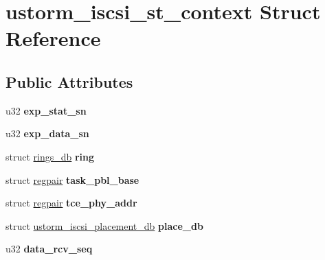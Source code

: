 \hypertarget{structustorm__iscsi__st__context}{
\section{ustorm\_\-iscsi\_\-st\_\-context Struct Reference}
\label{structustorm__iscsi__st__context}
}
\subsection*{Public Attributes}
\begin{DoxyCompactItemize}
\item 
\hypertarget{structustorm__iscsi__st__context_a0984ed8aecf44c26563da4ea19f72ad2}{
u32 {\bfseries exp\_\-stat\_\-sn}}
\label{structustorm__iscsi__st__context_a0984ed8aecf44c26563da4ea19f72ad2}

\item 
\hypertarget{structustorm__iscsi__st__context_ad22d74f156f85f8bc7b51f7c9fc9d5d4}{
u32 {\bfseries exp\_\-data\_\-sn}}
\label{structustorm__iscsi__st__context_ad22d74f156f85f8bc7b51f7c9fc9d5d4}

\item 
\hypertarget{structustorm__iscsi__st__context_af02afa453727feaea584090b829a2a4d}{
struct \hyperlink{structrings__db}{rings\_\-db} {\bfseries ring}}
\label{structustorm__iscsi__st__context_af02afa453727feaea584090b829a2a4d}

\item 
\hypertarget{structustorm__iscsi__st__context_abf27d498849c647ade18601549729c87}{
struct \hyperlink{structregpair}{regpair} {\bfseries task\_\-pbl\_\-base}}
\label{structustorm__iscsi__st__context_abf27d498849c647ade18601549729c87}

\item 
\hypertarget{structustorm__iscsi__st__context_a631c57f473c3214ceb3f52697fe7bd18}{
struct \hyperlink{structregpair}{regpair} {\bfseries tce\_\-phy\_\-addr}}
\label{structustorm__iscsi__st__context_a631c57f473c3214ceb3f52697fe7bd18}

\item 
\hypertarget{structustorm__iscsi__st__context_a84fc6397a2530b6673c9ed66119de30f}{
struct \hyperlink{structustorm__iscsi__placement__db}{ustorm\_\-iscsi\_\-placement\_\-db} {\bfseries place\_\-db}}
\label{structustorm__iscsi__st__context_a84fc6397a2530b6673c9ed66119de30f}

\item 
\hypertarget{structustorm__iscsi__st__context_a8933f872c9da443a49c7b63dd2d99645}{
u32 {\bfseries data\_\-rcv\_\-seq}}
\label{structustorm__iscsi__st__context_a8933f872c9da443a49c7b63dd2d99645}


\end{DoxyCompactItemize}

